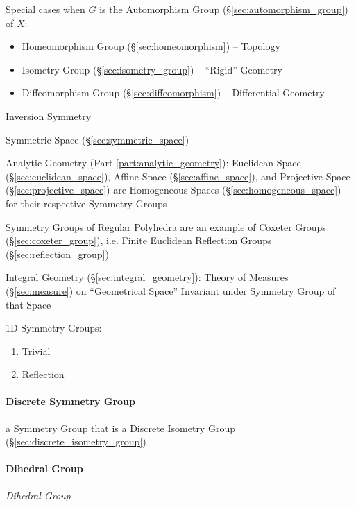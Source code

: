 Special cases when $G$ is the Automorphism Group
(\S\ref{sec:automorphism_group}) of $X$:
\begin{itemize}
  \item Homeomorphism Group (\S\ref{sec:homeomorphism}) -- Topology
  \item Isometry Group (\S\ref{sec:isometry_group}) -- ``Rigid'' Geometry
  \item Diffeomorphism Group (\S\ref{sec:diffeomorphism}) -- Differential
    Geometry
\end{itemize}

Inversion Symmetry %

\fist Symmetric Space (\S\ref{sec:symmetric_space})

Analytic Geometry (Part \ref{part:analytic_geometry}): Euclidean Space
(\S\ref{sec:euclidean_space}), Affine Space (\S\ref{sec:affine_space}), and
Projective Space (\S\ref{sec:projective_space}) are Homogeneous Spaces
(\S\ref{sec:homogeneous_space}) for their respective Symmetry Groups

Symmetry Groups of Regular Polyhedra are an example of Coxeter Groups
(\S\ref{sec:coxeter_group}), i.e. Finite Euclidean Reflection Groups
(\S\ref{sec:reflection_group})

Integral Geometry (\S\ref{sec:integral_geometry}): Theory of Measures
(\S\ref{sec:measure}) on ``Geometrical Space'' Invariant under Symmetry Group of
that Space

1D Symmetry Groups: %
\begin{enumerate}
  \item Trivial
  \item Reflection
\end{enumerate}



\paragraph{Discrete Symmetry Group}\label{sec:discrete_symmetry_group}\hfill

a Symmetry Group that is a Discrete Isometry Group
(\S\ref{sec:discrete_isometry_group})



\paragraph{Dihedral Group}\label{sec:dihedral_group}\hfill

\emph{Dihedral Group}

